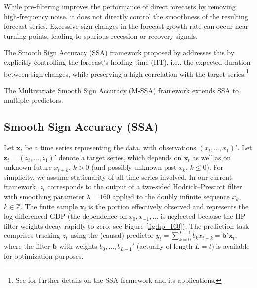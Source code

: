 \documentclass[11pt,a4paper]{article}
\begin{document}
While pre-filtering improves the performance of direct forecasts by removing high-frequency noise, it does not directly control the smoothness of the resulting forecast series. Excessive sign changes in the forecast growth rate can occur near turning points, leading to spurious recession or recovery signals. 

The Smooth Sign Accuracy (SSA) framework proposed by \cite{Wildi2024,Wildi2025} addresses this by explicitly controlling the forecast’s holding time (HT), i.e.. the expected duration between sign changes, while preserving a high correlation with the target series.\footnote{See \cite{Wildi2024} for further details on the SSA framework and its applications.}

The Multivariate Smooth Sign Accuracy (M-SSA) framework extends SSA to multiple predictors.

\subsection{
 Smooth Sign Accuracy (SSA)}

Let $\mathbf{x}_t$ be a time series representing the data, with observations $(x_{t},...,x_{1})'$. Let $\mathbf{z}_t=(z_{t},...,z_1)'$  denote a target series, which depends on $\mathbf{x}_t$ as well as on unknown future $x_{t+k}$, $k>0$ (and possibly unknown past $x_k$, $k\leq 0$). For simplicity, we assume stationarity of all time series involved. In our current framework, $z_t$ corresponds to the output of a two-sided Hodrick–Prescott filter with smoothing parameter $\lambda = 160$ applied to the doubly infinite sequence $x_k$, $k\in\mathbb{Z}$. The finite sample $\mathbf{x}_t$ is the portion effectively observed and represents the log-differenced GDP (the dependence on $x_0, x_{-1},...$ is neglected because the HP filter weights decay rapidly to zero; see Figure \ref{fig:hp_160}). The prediction task comprises tracking $z_{t}$ using the (causal) predictor $y_{t}=\sum_{k=0}^{L-1} b_{k}x_{t-k}=\mathbf{b}'\mathbf{x}_t$, where the filter $\mathbf{b}$ with weights $b_0,...,b_{L-1}'$ (actually of length $L=t$) is available for optimization purposes.
\end{document}
